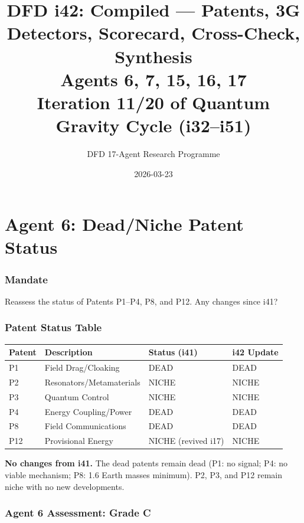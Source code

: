 \documentclass[11pt,a4paper]{article}
\title{DFD i42: Compiled --- Patents, 3G Detectors, Scorecard, Cross-Check, Synthesis\\[6pt]
\large Agents 6, 7, 15, 16, 17\\[6pt]
\normalsize Iteration 11/20 of Quantum Gravity Cycle (i32--i51)}
\author{DFD 17-Agent Research Programme}
\date{2026-03-23}
\begin{document}
\maketitle
\tableofcontents
\newpage

\part{Agent 6: Dead/Niche Patent Status}
\label{part:agent6}

\section{Mandate}

Reassess the status of Patents P1--P4, P8, and P12. Any changes since i41?

\section{Patent Status Table}

\begin{center}
\begin{tabular}{llll}
\toprule
\textbf{Patent} & \textbf{Description} & \textbf{Status (i41)} & \textbf{i42 Update} \\
\midrule
P1 & Field Drag/Cloaking & DEAD & DEAD \\
P2 & Resonators/Metamaterials & NICHE & NICHE \\
P3 & Quantum Control & NICHE & NICHE \\
P4 & Energy Coupling/Power & DEAD & DEAD \\
P8 & Field Communications & DEAD & DEAD \\
P12 & Provisional Energy & NICHE (revived i17) & NICHE \\
\bottomrule
\end{tabular}
\end{center}

\textbf{No changes from i41.} The dead patents remain dead (P1: no signal; P4: no viable mechanism; P8: 1.6 Earth masses minimum). P2, P3, and P12 remain niche with no new developments.

\section{Agent 6 Assessment: Grade C}
\end{document}
